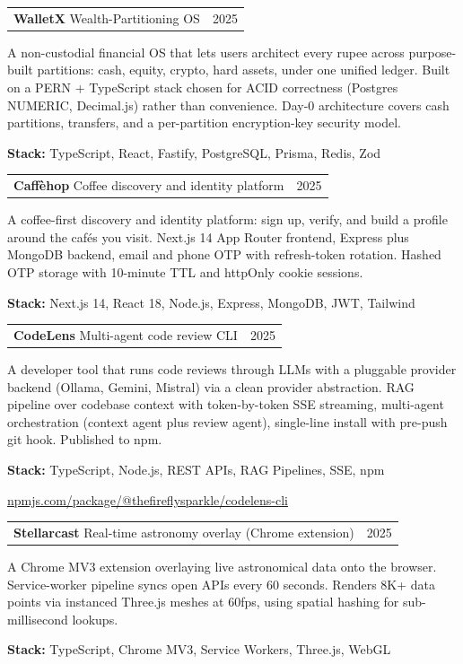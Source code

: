 \documentclass[10pt,letterpaper]{article}
\makeatletter
\newcommand{\projectheader}[3]{%
  \begin{tabularx}{\textwidth}{@{}Xr@{}}
    \textbf{#1} {\color{accent}\textbar{} #2} & {\color{accent}#3} \\
  \end{tabularx}\vspace{2pt}
}
\makeatother
\begin{document}
\projectheader{WalletX}{Wealth-Partitioning OS}{2025}

A non-custodial financial OS that lets users architect every rupee across
purpose-built partitions: cash, equity, crypto, hard assets, under one
unified ledger. Built on a PERN + TypeScript stack chosen for ACID
correctness (Postgres NUMERIC, Decimal.js) rather than convenience. Day-0
architecture covers cash partitions, transfers, and a per-partition
encryption-key security model.

\textbf{Stack:} TypeScript, React, Fastify, PostgreSQL, Prisma, Redis, Zod

\vspace{6pt}
\projectheader{Caff\`ehop}{Coffee discovery and identity platform}{2025}

A coffee-first discovery and identity platform: sign up, verify, and build
a profile around the caf\'es you visit. Next.js 14 App Router frontend,
Express plus MongoDB backend, email and phone OTP with refresh-token
rotation. Hashed OTP storage with 10-minute TTL and httpOnly cookie sessions.

\textbf{Stack:} Next.js 14, React 18, Node.js, Express, MongoDB, JWT, Tailwind

\vspace{6pt}
\projectheader{CodeLens}{Multi-agent code review CLI}{2025}

A developer tool that runs code reviews through LLMs with a pluggable
provider backend (Ollama, Gemini, Mistral) via a clean provider abstraction.
RAG pipeline over codebase context with token-by-token SSE streaming,
multi-agent orchestration (context agent plus review agent), single-line
install with pre-push git hook. Published to npm.

\textbf{Stack:} TypeScript, Node.js, REST APIs, RAG Pipelines, SSE, npm

\href{https://www.npmjs.com/package/@thefireflysparkle/codelens-cli}{npmjs.com/package/@thefireflysparkle/codelens-cli}

\vspace{6pt}
\projectheader{Stellarcast}{Real-time astronomy overlay (Chrome extension)}{2025}

A Chrome MV3 extension overlaying live astronomical data onto the browser.
Service-worker pipeline syncs open APIs every 60 seconds. Renders 8K+ data
points via instanced Three.js meshes at 60fps, using spatial hashing for
sub-millisecond lookups.

\textbf{Stack:} TypeScript, Chrome MV3, Service Workers, Three.js, WebGL
\end{document}
